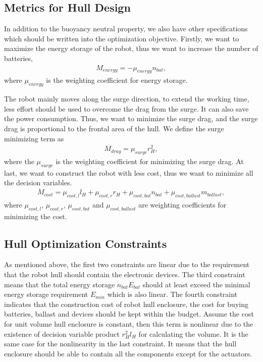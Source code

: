 \subsection{Metrics for Hull Design}
In addition to the buoyancy neutral property, we also have other specifications which should be written into the optimization objective.
Firstly, we want to maximize the energy storage of the robot, thus we want to increase the number of batteries,
\begin{align}
M_{energy}=-\mu_{energy}n_{bat},
\end{align}
where $\mu_{energy}$ is the weighting coefficient for energy storage.

The robot mainly moves along the surge direction, to extend the working time, less effort should be used to overcome the drag from the surge. It can also save the power consumption. Thus, we want to minimize the surge drag, and the surge drag is proportional to the frontal area of the hull. We define the surge minimizing term as
\begin{align}
M_{drag}=\mu_{surge}r_{H}^{2},
\end{align}
where the $\mu_{surge}$ is the weighting coefficient for minimizing the surge drag.
At last, we want to construct the robot with less cost, thus we want to minimize all the decision variables.
\begin{align}
M_{cost}=\mu_{cost,l}l_{H}+\mu_{cost,r}r_{H}+\mu_{cost,bat}n_{bat}
+\mu_{cost,ballast}m_{ballast},
\end{align}
where $\mu_{cost,l}$, $\mu_{cost,r}$, $\mu_{cost,bat}$ and $\mu_{cost,ballast}$ are weighting coefficients for minimizing the cost.
\subsection{Hull Optimization Constraints}
As mentioned above, the first two constraints are linear due to the requirement that the robot hull should contain the electronic devices. The third constraint means that the total energy storage $n_{bat}E_{bat}$ should at least exceed the minimal energy storage requirement $E_{min}$ which is also linear. The fourth constraint indicates that the construction cost of robot hull enclosure, the cost for buying batteries, ballast and devices should be kept within the budget. Assume the cost for unit volume hull enclosure is constant, then this term is nonlinear due to the existence of decision variable product $r_{H}^{2}l_{H}$ for calculating the volume. It is the same case for the nonlinearity in the last constraint. It means that the hull enclosure should be able to contain all the components except for the actuators.   
